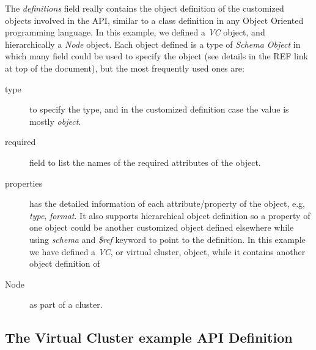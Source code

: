 The \emph{definitions} field really contains the object definition of
the customized objects involved in the API, similar to a class
definition in any Object Oriented programming language. In this
example, we defined a \emph{VC} object, and hierarchically a
\emph{Node} object. Each object defined is a type of \emph{Schema
  Object} in which many field could be used to specify the object (see
details in the REF link at top of the document), but the most
frequently used ones are:

\begin{description}
\item[type] to specify the type, and in the customized definition case
  the value is mostly \emph{object}.
\item[required] field to list the names of the required attributes of
  the object.
\item[properties] has the detailed information of each
  attribute/property of the object, e.g, \emph{type},
  \emph{format}. It also supports hierarchical object definition so a
  property of one object could be another customized object defined
  elsewhere while using \emph{schema} and \emph{\$ref} keyword to
  point to the definition. In this example we have defined a
  \emph{VC}, or virtual cluster, object, while it contains another
  object definition of
\item[Node] as part of a cluster.
\end{description}

\subsection{The Virtual Cluster example API Definition}
\label{S:vcluster-spec}

